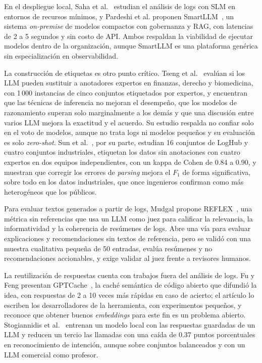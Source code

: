 En el despliegue local, Saha et al.~\cite{saha2025_slm_minimal} estudian el análisis de logs con SLM en entornos de recursos mínimos, y Pardeshi et al. proponen SmartLLM~\cite{pardeshi2026_smartllm}, un sistema \textit{on-premise} de modelos compactos con gobernanza y RAG, con latencias de 2 a 5 segundos y sin costo de API. Ambos respaldan la viabilidad de ejecutar modelos dentro de la organización, aunque SmartLLM es una plataforma genérica sin especialización en observabilidad.

La construcción de etiquetas es otro punto crítico. Tseng et al.~\cite{tseng2025_expert_annotators} evalúan si los LLM pueden sustituir a anotadores expertos en finanzas, derecho y biomedicina, con 1\,000 instancias de cinco conjuntos etiquetados por expertos, y encuentran que las técnicas de inferencia no mejoran el desempeño, que los modelos de razonamiento superan solo marginalmente a los demás y que una discusión entre varios LLM mejora la exactitud y el acuerdo. Su estudio respalda no confiar solo en el voto de modelos, aunque no trata logs ni modelos pequeños y su evaluación es solo \textit{zero-shot}. Sun et al.~\cite{sun2026_parsing}, por su parte, estudian 16 conjuntos de LogHub y cuatro conjuntos industriales, etiquetan los datos sin anotaciones con cuatro expertos en dos equipos independientes, con un kappa de Cohen de 0.84 a 0.90, y muestran que corregir los errores de \textit{parsing} mejora el $F_1$ de forma significativa, sobre todo en los datos industriales, que once ingenieros confirman como más heterogéneos que los públicos.

Para evaluar textos generados a partir de logs, Mudgal propone REFLEX~\cite{mudgal2025_reflex}, una métrica sin referencias que usa un LLM como juez para calificar la relevancia, la informatividad y la coherencia de resúmenes de logs. Abre una vía para evaluar explicaciones y recomendaciones sin textos de referencia, pero se validó con una muestra cualitativa pequeña de 50 entradas, evalúa resúmenes y no recomendaciones accionables, y exige validar al juez frente a revisores humanos.

La reutilización de respuestas cuenta con trabajos fuera del análisis de logs. Fu y Feng presentan GPTCache~\cite{fu2023_gptcache}, la caché semántica de código abierto que difundió la idea, con respuestas de 2 a 10 veces más rápidas en caso de acierto; el artículo lo escriben los desarrolladores de la herramienta, con experimentos pequeños, y reconoce que obtener buenos \textit{embeddings} para este fin es un problema abierto. Stogiannidis et al.~\cite{stogiannidis2023_cache} entrenan un modelo local con las respuestas guardadas de un LLM y reducen un tercio las llamadas con una caída de 0.37 puntos porcentuales en reconocimiento de intención, aunque sobre conjuntos balanceados y con un LLM comercial como profesor.

